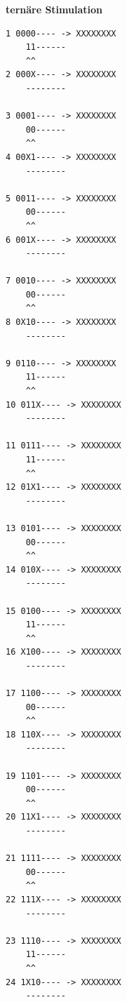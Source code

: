 \documentclass[fleqn]{article}
\begin{document}
\textbf{ternäre Stimulation}
\begin{lstlisting}
1 0000---- -> XXXXXXXX                                         
    11------
    ^^      
2 000X---- -> XXXXXXXX                                         
    --------
            
3 0001---- -> XXXXXXXX                                         
    00------
    ^^      
4 00X1---- -> XXXXXXXX                                         
    --------
            
5 0011---- -> XXXXXXXX                                         
    00------
    ^^      
6 001X---- -> XXXXXXXX                                         
    --------
            
7 0010---- -> XXXXXXXX                                         
    00------
    ^^      
8 0X10---- -> XXXXXXXX                                         
    --------
            
9 0110---- -> XXXXXXXX                                         
    11------
    ^^      
10 011X---- -> XXXXXXXX                                         
    --------
            
11 0111---- -> XXXXXXXX                                         
    11------
    ^^      
12 01X1---- -> XXXXXXXX                                         
    --------
            
13 0101---- -> XXXXXXXX                                         
    00------
    ^^      
14 010X---- -> XXXXXXXX                                         
    --------
            
15 0100---- -> XXXXXXXX                                         
    11------
    ^^      
16 X100---- -> XXXXXXXX                                         
    --------
            
17 1100---- -> XXXXXXXX                                         
    00------
    ^^      
18 110X---- -> XXXXXXXX                                         
    --------
            
19 1101---- -> XXXXXXXX                                         
    00------
    ^^      
20 11X1---- -> XXXXXXXX                                         
    --------
            
21 1111---- -> XXXXXXXX                                         
    00------
    ^^      
22 111X---- -> XXXXXXXX                                         
    --------
            
23 1110---- -> XXXXXXXX                                         
    11------
    ^^      
24 1X10---- -> XXXXXXXX                                         
    --------
            

\end{lstlisting}
\end{document}
